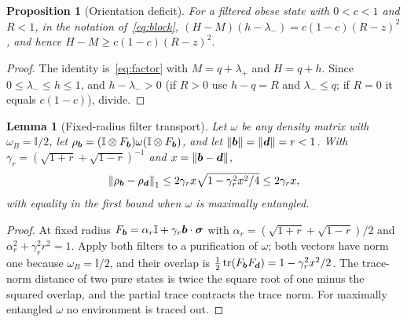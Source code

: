 \documentclass[11pt]{article}
\newtheorem{lemma}[theorem]{Lemma}
\newtheorem{proposition}[theorem]{Proposition}
\theoremstyle{remark}\newtheorem{remark}[theorem]{Remark}
\DeclareMathOperator{\tr}{tr}\DeclareMathOperator{\diag}{diag}
\newcommand{\id}{\mathbb I}\newcommand{\ket}[1]{|#1\rangle}
\newcommand{\norm}[1]{\left\lVert#1\right\rVert}
\begin{document}
\begin{proposition}[Orientation deficit]\label{prop:orientation}
For a filtered obese state with $0<c<1$ and $R<1$, in the notation
of~\eqref{eq:block},
$(H-M)(h-\lambda_-)=c(1-c)(R-z)^2$, and hence $H-M\ge c(1-c)(R-z)^2$.
\end{proposition}
\begin{proof}
The identity is~\eqref{eq:factor} with $M=q+\lambda_+$ and $H=q+h$. Since
$0\le\lambda_-\le h\le1$, and $h-\lambda_->0$ (if $R>0$ use $h-q=R$ and
$\lambda_-\le q$; if $R=0$ it equals $c(1-c)$), divide.
\end{proof}

\begin{lemma}[Fixed-radius filter transport]\label{lem:filter-metric}
Let $\omega$ be any density matrix with $\omega_B=\id/2$, let
$\rho_{\bv}=(\id\otimes F_{\bv})\omega(\id\otimes F_{\bv})$, and let
$\norm{\bv}=\norm{\bm d}=r<1$. With $\gamma_r=(\sqrt{1+r}+\sqrt{1-r})^{-1}$ and
$x=\norm{\bv-\bm d}$,
\[
 \norm{\rho_{\bv}-\rho_{\bm d}}_1\le2\gamma_rx\sqrt{1-\gamma_r^2x^2/4}\le2\gamma_rx,
\]
with equality in the first bound when $\omega$ is maximally entangled.
\end{lemma}
\begin{proof}
At fixed radius $F_{\bv}=\alpha_r\id+\gamma_r\bv\cdot\bm\sigma$ with
$\alpha_r=(\sqrt{1+r}+\sqrt{1-r})/2$ and $\alpha_r^2+\gamma_r^2r^2=1$. Apply both
filters to a purification of $\omega$; both vectors have norm one because
$\omega_B=\id/2$, and their overlap is
$\frac12\tr(F_{\bv}F_{\bm d})=1-\gamma_r^2x^2/2$. The trace-norm distance of two
pure states is twice the square root of one minus the squared overlap, and the
partial trace contracts the trace norm. For maximally entangled $\omega$ no
environment is traced out.
\end{proof}
\end{document}

